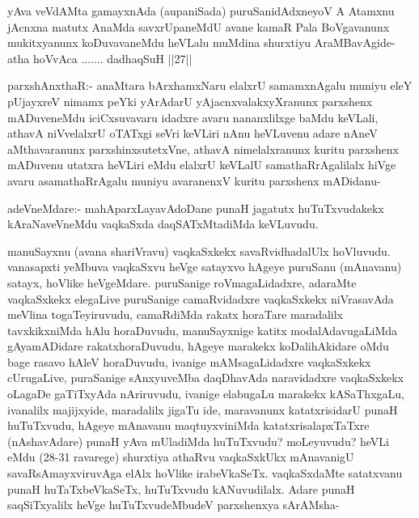 \begin{artha}
yAva veVdAMta gamayxnAda (aupaniSada) puruSanidAdxneyoV A Atamxnu jAcnxna matutx AnaMda savxrUpaneMdU avane kamaR Pala BoVgavanunx mukitxyanunx koDuvavaneMdu heVLalu muMdina shurxtiyu AraMBavAgide- atha hoVvAca ....... dadhaqSuH ||27||
\end{artha}

\begin{artha}
parxshAnxthaR:- anaMtara bArxhamxNaru elalxrU samamxnAgalu muniyu eleY pUjayxreV nimamx peYki yArAdarU yAjacnxvalakxyXranunx parxshenx mADuveneMdu iciCxsuvavaru idadxre avaru nananxlilxge baMdu keVLali, athavA niVvelalxrU oTATxgi seVri keVLiri nAnu heVLuvenu adare nAneV aMthavaranunx parxshinxsutetxVne, athavA nimelalxranunx kuritu parxshenx mADuvenu utatxra heVLiri eMdu elalxrU keVLalU samathaRrAgalilalx hiVge avaru asamathaRrAgalu muniyu avaranenxV kuritu parxshenx mADidanu-
\end{artha}

\begin{artha}
adeVneMdare:- mahAparxLayavAdoDane punaH jagatutx huTuTxvudakekx kAraNaveVneMdu vaqkaSxda daqSATxMtadiMda keVLuvudu. 
\end{artha}

\begin{artha}
manuSayxnu (avana shariVravu) vaqkaSxkekx savaRvidhadalUlx hoVluvudu. vanasapxti	yeMbuva vaqkaSxvu heVge satayxvo hAgeye puruSanu (mAnavanu) satayx, hoVlike heVgeMdare. puruSanige roVmagaLidadxre, adaraMte vaqkaSxkekx elegaLive puruSanige camaRvidadxre vaqkaSxkekx niVrasavAda meVlina togaTeyiruvudu, camaRdiMda rakatx horaTare maradalilx tavxkikxniMda hAlu horaDuvudu, manuSayxnige katitx modalAdavugaLiMda gAyamADidare rakatxhoraDuvudu, hAgeye marakekx koDalihAkidare oMdu bage rasavo hAleV horaDuvudu, ivanige mAMsagaLidadxre vaqkaSxkekx cUrugaLive, puraSanige sAnxyuveMba daqDhavAda naravidadxre vaqkaSxkekx oLagaDe gaTiTxyAda nAriruvudu, ivanige elabugaLu marakekx kASaThxgaLu, ivanalilx majijxyide, maradalilx jigaTu ide, maravanunx katatxrisidarU punaH huTuTxvudu, hAgeye mAnavanu maqtuyxviniMda katatxrisalapxTaTxre (nAshavAdare) punaH yAva mUladiMda huTuTxvudu? moLeyuvudu? heVLi eMdu (28-31 ravarege) shurxtiya athaRvu vaqkaSxkUkx mAnavanigU savaRsAmayxviruvAga elAlx hoVlike irabeVkaSeTx. vaqkaSxdaMte satatxvanu punaH huTaTxbeVkaSeTx, huTuTxvudu kANuvudilalx. Adare punaH saqSiTxyalilx heVge huTuTxvudeMbudeV parxshenxya sArAMsha-
\end{artha}%

